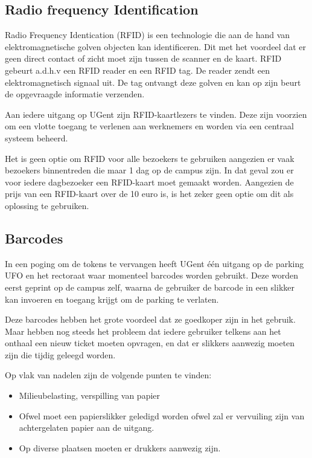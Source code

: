 \subsection{Radio frequency Identification}

Radio Frequency Identication (RFID) is een technologie die aan de hand van elektromagnetische golven objecten kan identificeren. Dit met het voordeel dat er geen direct contact of zicht moet zijn tussen de scanner en de kaart. RFID gebeurt a.d.h.v een RFID reader en een RFID tag. De reader zendt een elektromagnetisch signaal uit. De tag ontvangt deze golven en kan op zijn beurt de opgevraagde informatie verzenden. \autocite{li2009design}

Aan iedere uitgang op UGent zijn RFID-kaartlezers te vinden. Deze zijn voorzien om een vlotte toegang te verlenen aan werknemers en worden via een centraal systeem beheerd.

Het is geen optie om RFID voor alle bezoekers te gebruiken aangezien er vaak bezoekers binnentreden die maar 1 dag op de campus zijn. In dat geval zou er voor iedere dagbezoeker een RFID-kaart moet gemaakt worden. Aangezien de prijs van een RFID-kaart over de 10 euro is, is het zeker geen optie om dit als oplossing te gebruiken.

\subsection{Barcodes}
In een poging om de tokens te vervangen heeft UGent één uitgang op de parking UFO en het rectoraat waar momenteel barcodes worden gebruikt. Deze worden eerst geprint op de campus zelf, waarna de gebruiker de barcode in een slikker kan invoeren en toegang krijgt om de parking te verlaten.

Deze barcodes hebben het grote voordeel dat ze goedkoper zijn in het gebruik. Maar hebben nog steeds het probleem dat iedere gebruiker telkens aan het onthaal een nieuw ticket moeten opvragen, en dat er slikkers aanwezig moeten zijn die tijdig geleegd worden.

Op vlak van nadelen zijn de volgende punten te vinden:
\begin{itemize}
	\item Milieubelasting, verspilling van papier
	\item Ofwel moet een papierslikker geledigd worden ofwel zal er vervuiling zijn van achtergelaten papier aan de uitgang.
	\item Op diverse plaatsen moeten er drukkers aanwezig zijn.
\end{itemize}


